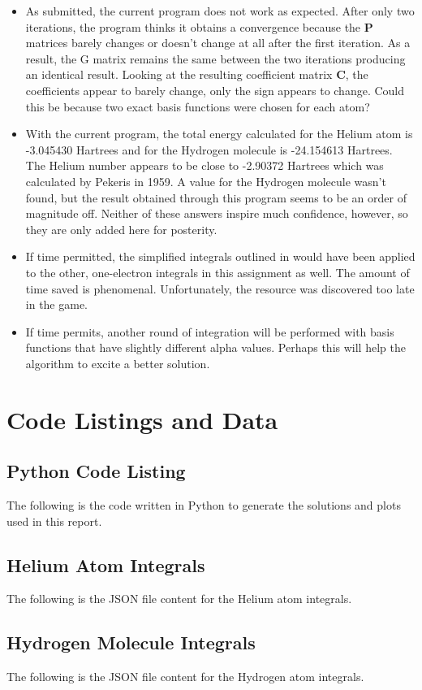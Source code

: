 \documentclass[10pt, oneside, letterpaper]{article}
\begin{document}
\begin{itemize}
    \item As submitted, the current program does not work as expected. After only two iterations, the program thinks it obtains a convergence because the $\bm{P}$ matrices barely changes or doesn't change at all after the first iteration. As a result, the G matrix remains the same between the two iterations producing an identical result. Looking at the resulting coefficient matrix $\bm{C}$, the coefficients appear to barely change, only the sign appears to change. Could this be because two exact basis functions were chosen for each atom?
    \item With the current program, the total energy calculated for the Helium atom is -3.045430 Hartrees and for the Hydrogen molecule is -24.154613 Hartrees. The Helium number appears to be close to -2.90372 Hartrees which was calculated by Pekeris in 1959. A value for the Hydrogen molecule wasn't found, but the result obtained through this program seems to be an order of magnitude off. Neither of these answers inspire much confidence, however, so they are only added here for posterity.
    \item If time permitted, the simplified integrals outlined in \cite{molecular-integrals-over-gaussian-basis-functions} would have been applied to the other, one-electron integrals in this assignment as well. The amount of time saved is phenomenal. Unfortunately, the resource was discovered too late in the game.
    \item If time permits, another round of integration will be performed with basis functions that have slightly different alpha values. Perhaps this will help the algorithm to excite a better solution.
\end{itemize}

\newpage
\section{Code Listings and Data}

\subsection{Python Code Listing}
\label{code-listing-python}
The following is the code written in Python to generate the solutions and plots used in this report.


\subsection{Helium Atom Integrals}
\label{he-integrals}
The following is the JSON file content for the Helium atom integrals.


\subsection{Hydrogen Molecule Integrals}
\label{h2-integrals}
The following is the JSON file content for the Hydrogen atom integrals.


\nocite{*}

\newpage


\end{document}
